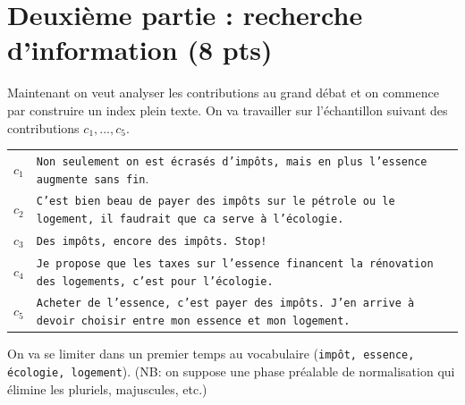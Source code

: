 \documentclass[11pt,a4paper]{article}
\begin{document}
\section*{Deuxième partie : recherche d'information (8 pts)}

Maintenant on veut analyser les contributions au grand débat et on commence par
construire un index plein texte. On va travailler sur l'échantillon
suivant des contributions $c_1, ..., c_5$.


\vspace*{0.3cm}

\begin{tabular}{lp{15cm}}
     $c_1$& \texttt{Non seulement on est écrasés d'impôts, mais en plus l'essence augmente sans fin}.\\
     $c_2$& \texttt{C'est bien beau de payer des impôts sur le pétrole ou le logement, il faudrait que ca serve à l'écologie.}\\
     $c_3$& \texttt{Des impôts, encore des impôts. Stop!}\\
     $c_4$& \texttt{Je propose que les taxes sur l'essence financent la rénovation des logements, c'est pour l'écologie.}\\
     $c_5$& \texttt{Acheter de l'essence, c'est payer des impôts. J'en arrive à devoir choisir entre mon essence et mon logement.}\\ 
\end{tabular}

\bigskip

On va se limiter dans un premier temps au vocabulaire (\texttt{impôt, essence, écologie, logement}).
(NB: on suppose
     une phase préalable de normalisation qui élimine les pluriels, majuscules, etc.)
\end{document}
